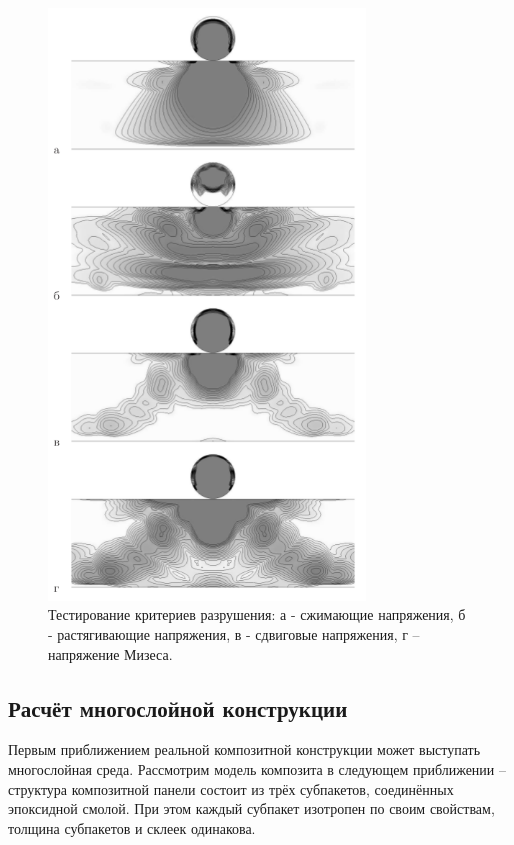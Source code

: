 \begin{figure}[h]
\centering
\includegraphics[width=0.75\textwidth]{png/destruction_test.png}
\caption{Тестирование критериев разрушения: а - сжимающие напряжения, б - растягивающие напряжения, в - сдвиговые напряжения, г – напряжение Мизеса.}
\label{pic:destruction_test}
\end{figure}

\clearpage
\newpage


\subsection{Расчёт многослойной конструкции}

Первым приближением реальной композитной конструкции может выступать многослойная среда. Рассмотрим модель композита в следующем приближении -- структура композитной панели состоит из трёх субпакетов, соединённых эпоксидной смолой. При этом каждый субпакет изотропен по своим свойствам, толщина субпакетов и склеек одинакова.

